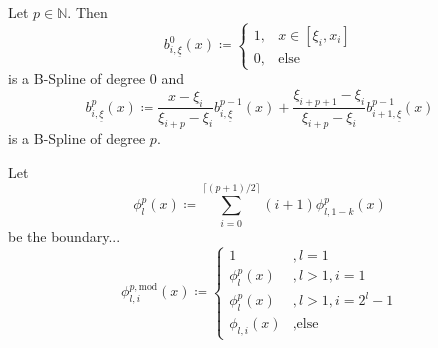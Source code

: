 \documentclass[
  a4paper,  %
  twoside,  %
  bibliography=totoc,
  headsepline,
  cleardoublepage=empty,
  parskip=half,
  draft=false
]{scrbook}
\begin{document}
\begin{definition}[B-Splines]
Let $p \in \mathds{N}$.
Then
\begin{equation}
b^0_{i,\underline{\xi}}(x) \coloneqq
\begin{cases}
    1, & x \in [\xi_i,x_i] \\
   0, & \text{else}
\end{cases}
\end{equation}
is a B-Spline of degree $0$ and
\begin{equation}
b_{i,\underline{\xi}}^p(x) \coloneqq \frac{x - \xi_i}{\xi_{i + p} - \xi_i} b_{i,\underline{\xi}}^{p-1}(x) + \frac{\xi_{i+p+1} - \xi_i}{\xi_{i + p} - \xi_i} b_{i+1,\underline{\xi}}^{p-1}(x)
\end{equation}
is a B-Spline of degree $p$.
\end{definition}

\begin{definition}
Let
\begin{equation}
\phi_l^p(x) \coloneqq \sum_{i=0}^{\lceil (p+1)/2 \rceil} (i+1) \phi^p_{l,1-k}(x)
\end{equation}
be the boundary...
\begin{equation}
\phi^{p,\text{mod}}_{l,i}(x) \coloneqq
\begin{cases}
1 &, l=1\\
\phi^p_{l}(x)&, l>1, i=1\\
\phi^p_{l}(x)&, l>1, i=2^l - 1\\
\phi_{l,i}(x)&, \text{else}
\end{cases}
\end{equation}
\end{definition}

\newpage
\printbibliography


\pagestyle{empty}
\renewcommand*{\chapterpagestyle}{empty}
\Versicherung
\end{document}
